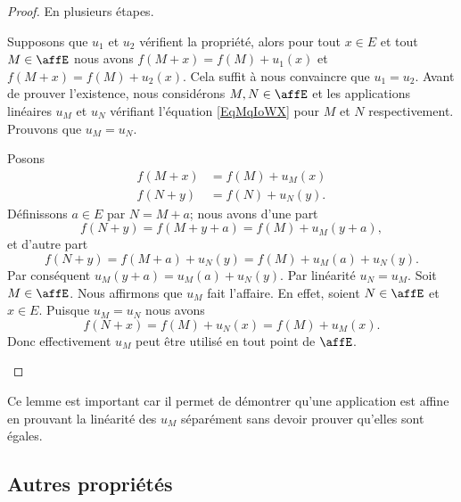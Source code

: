 \begin{proof}
	En plusieurs étapes.
	\begin{subproof}
		\spitem[Unicité]
		Supposons que \( u_1\) et \( u_2\) vérifient la propriété, alors pour tout \( x\in E\) et tout \( M\in \affE\) nous avons \( f(M+x)=f(M)+u_1(x)\) et \( f(M+x)=f(M)+u_2(x)\). Cela suffit à nous convaincre que \( u_1=u_2\).
		\spitem[\( u_M=u_N\)]
		Avant de prouver l'existence, nous considérons \( M,N\in \affE\) et les applications linéaires \( u_M\) et \( u_N\) vérifiant l'équation \eqref{EqMqIoWX} pour \( M\) et \( N\) respectivement. Prouvons que \( u_M=u_N\).

		Posons
		\begin{subequations}
			\begin{align}
				f(M+x) & =f(M)+u_M(x)  \\
				f(N+y) & =f(N)+u_N(y).
			\end{align}
		\end{subequations}
		Définissons \( a\in E\) par \( N=M+a\); nous avons d'une part
		\begin{equation}
			f(N+y)=f(M+y+a)=f(M)+u_M(y+a),
		\end{equation}
		et d'autre part
		\begin{equation}
			f(N+y)=f(M+a)+u_N(y)=f(M)+u_M(a)+u_N(y).
		\end{equation}
		Par conséquent \( u_M(y+a)=u_M(a)+u_N(y)\). Par linéarité \( u_N=u_M\).
		\spitem[Existence]
		Soit \( M\in \affE\). Nous affirmons que \( u_M\) fait l'affaire. En effet, soient \( N\in \affE\) et \( x\in E\). Puisque \( u_M=u_N\) nous avons
		\begin{equation}
			f(N+x)=f(M)+u_N(x)=f(M)+u_M(x).
		\end{equation}
		Donc effectivement \( u_M\) peut être utilisé en tout point de \( \affE\).
	\end{subproof}
\end{proof}
Ce lemme est important car il permet de démontrer qu'une application est affine en prouvant la linéarité des \( u_M\) séparément sans devoir prouver qu'elles sont égales.

\subsection{Autres propriétés}

